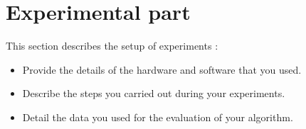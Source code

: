 \section{Experimental part}
\label{sec:experimentation}

{\color{red}
This section describes the setup of experiments \cite{zobel2014experimentation}:

\begin{itemize}
    \item Provide the details of the hardware and software that you used.
    \item Describe the steps you carried out during your experiments.
    \item Detail the data you used for the evaluation of your algorithm.
\end{itemize}
}

\lipsum[4]

